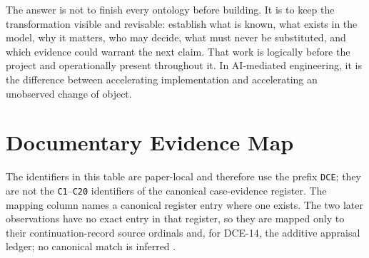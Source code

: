 \documentclass[10pt,a4paper]{article}
\begin{document}
The answer is not to finish every ontology before building. It is to keep the transformation visible and revisable: establish what is known, what exists in the model, why it matters, who may decide, what must never be substituted, and which evidence could warrant the next claim. That work is logically before the project and operationally present throughout it. In AI-mediated engineering, it is the difference between accelerating implementation and accelerating an unobserved change of object.

\appendix
\section{Documentary Evidence Map}

The identifiers in this table are paper-local and therefore use the prefix \texttt{DCE}; they are not the \texttt{C1}--\texttt{C20} identifiers of the canonical case-evidence register. The mapping column names a canonical register entry where one exists. The two later observations have no exact entry in that register, so they are mapped only to their continuation-record source ordinals and, for DCE-14, the additive appraisal ledger; no canonical match is inferred \cite{caseevidence,stakeholderledger,sessionrecord}.
\end{document}
